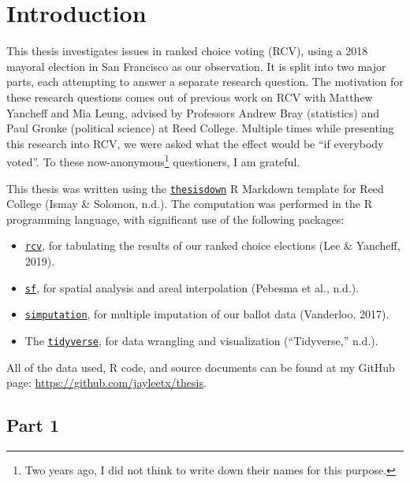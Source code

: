 \documentclass[12pt,twoside]{reedthesis}
\begin{document}
\mainmatter %
\pagestyle{fancyplain} %

\hypertarget{introduction}{%
\chapter*{Introduction}\label{introduction}}

This thesis investigates issues in ranked choice voting (RCV), using a 2018 mayoral election in San Francisco as our observation. It is split into two major parts, each attempting to answer a separate research question. The motivation for these research questions comes out of previous work on RCV with Matthew Yancheff and Mia Leung, advised by Professors Andrew Bray (statistics) and Paul Gronke (political science) at Reed College. Multiple times while presenting this research into RCV, we were asked what the effect would be ``if everybody voted''. To these now-anonymous\footnote{Two years ago, I did not think to write down their names for this purpose.} questioners, I am grateful.

This thesis was written using the \href{https://github.com/ismayc/thesisdown}{\texttt{thesisdown}} R Markdown template for Reed College (Ismay \& Solomon, n.d.). The computation was performed in the R programming language, with significant use of the following packages:
\begin{itemize}
\item
  \href{https://github.com/ds-elections/rcv}{\texttt{rcv}}, for tabulating the results of our ranked choice elections (Lee \& Yancheff, 2019).
\item
  \href{https://github.com/r-spatial/sf}{\texttt{sf}}, for spatial analysis and areal interpolation (Pebesma et al., n.d.).
\item
  \href{https://github.com/markvanderloo/simputation}{\texttt{simputation}}, for multiple imputation of our ballot data (Vanderloo, 2017).
\item
  The \href{https://www.tidyverse.org/}{\texttt{tidyverse}}, for data wrangling and visualization (``Tidyverse,'' n.d.).
\end{itemize}
All of the data used, R code, and source documents can be found at my GitHub page: \url{https://github.com/jayleetx/thesis}.

\hypertarget{part-1}{%
\section*{Part 1}\label{part-1}}
\end{document}
